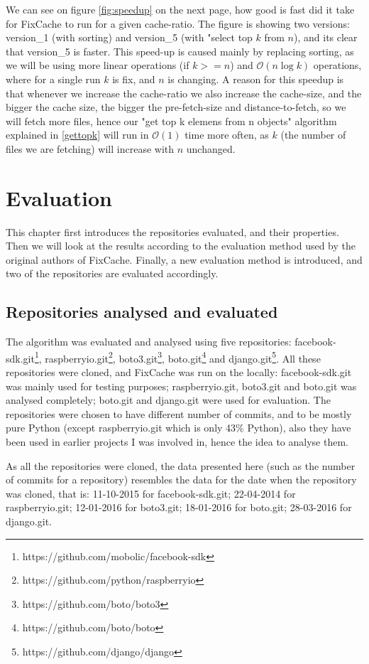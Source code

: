 \documentclass[12pt,twoside,notitlepage]{report}
\newcommand{\fxch}{FixCache}
\begin{document}
We can see on figure \ref{fig:speedup} on the next page, how good is fast did it take for \fxch{} to run for a given cache-ratio. The figure is showing two versions: version\_1 (with sorting) and version\_5 (with "select top $k$ from $n$), and its clear that version\_5 is faster.
This speed-up is caused mainly by replacing sorting, as we will be using more linear operations (if $k >= n$) and $\mathcal{O}(n\log{k})$ operations, where for a single run $k$ is fix, and $n$ is changing.
A reason for this speedup is that whenever we increase the cache-ratio we also increase the cache-size, and the bigger the cache size, the bigger the pre-fetch-size and distance-to-fetch, so we will fetch more files, hence our "get top k elemens from n objects" algorithm explained in \ref{gettopk} will run in $\mathcal{O}(1)$ time more often, as $k$ (the number of files we are fetching) will increase with $n$ unchanged.
\cleardoublepage
\chapter{Evaluation}
This chapter first introduces the repositories evaluated, and their properties. Then we will look at the results according to the evaluation method used by the original authors of \fxch{}. Finally, a new evaluation method is introduced, and two of the repositories are evaluated accordingly. 
\section{Repositories analysed and evaluated}
The algorithm was evaluated and analysed using five repositories: facebook-sdk.git\footnote{https://github.com/mobolic/facebook-sdk}, raspberryio.git\footnote{https://github.com/python/raspberryio}, boto3.git\footnote{https://github.com/boto/boto3}, boto.git\footnote{https://github.com/boto/boto} and django.git\footnote{https://github.com/django/django}. All these repositories were cloned, and \fxch{} was run on the locally: facebook-sdk.git was mainly used for testing purposes; raspberryio.git, boto3.git and boto.git was analysed completely; boto.git and django.git were used for evaluation. The repositories were chosen to have different number of commits, and to be mostly pure Python (except raspberryio.git which is only 43\% Python), also they have been used in earlier projects I was involved in, hence the idea to analyse them.

As all the repositories were cloned, the data presented here (such as the number of commits for a repository) resembles the data for the date when the repository was cloned, that is: 11-10-2015 for facebook-sdk.git; 22-04-2014 for raspberryio.git; 12-01-2016 for boto3.git; 18-01-2016 for boto.git; 28-03-2016 for django.git.
\end{document}
